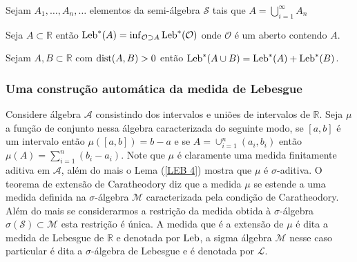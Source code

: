 
\begin{proposicao}
Sejam $A_1, \ldots, A_n, \ldots$ elementos da semi-álgebra 
$\mathcal{S}$ tais que $A=\bigcup_{i=1}^{\infty}A_n$


\end{proposicao}




\begin{proposicao}
Seja $A\subset \mathbb{R}$ então 
$ 
\textnormal{Leb}^{*}(A)
=
\inf_{\mathcal{O}\supset A}\textnormal{Leb}^{*}(\mathcal{O})
$ 
onde $\mathcal{O}$ é um aberto contendo $A$.
\end{proposicao}


\begin{proposicao}
Sejam $A,B\subset \mathbb{R}$ com $\textnormal{dist}(A,B)>0$ 
então 
$
\textnormal{Leb}^{*}(A\cup B)
=
\textnormal{Leb}^{*}(A)+\textnormal{Leb}^{*}(B)
$.
\end{proposicao}



\subsubsection{Uma construç\~ao autom\'atica da medida de Lebesgue}


Considere álgebra $\mathcal{A}$ consistindo dos 
intervalos e uniões de intervalos de   $\mathbb{R}.$ 
Seja  $\mu$ a  função de conjunto  nessa álgebra 
caracterizada do seguinte modo, se $[a,b]$ é um 
intervalo  então $\mu([a,b])=b-a$ 
e se $A=\cup_{i=1}^n(a_i,b_i)$ então 
$\mu(A)=\sum_{i=1}^n(b_i-a_i).$  
Note que $\mu$ é claramente uma medida 
finitamente aditiva em $\mathcal{A}$, 
além do mais o Lema (\ref{LEB 4}) mostra 
que $\mu$ é $\sigma$-aditiva. 
O teorema de extensão de Caratheodory diz que a 
medida $\mu$ se estende a uma medida definida na 
$\sigma$-álgebra  $\mathcal{M}$  
caracterizada pela condição de Caratheodory. 
Além do mais se considerarmos a restrição 
da medida obtida  à $\sigma$-álgebra
$\sigma(\mathcal{S})\subset \mathcal{M}$ 
esta restrição é única. A medida que é a 
extensão de $\mu$ é dita a medida de Lebesgue 
de $\mathbb{R}$ e denotada por $\textnormal{Leb}$, 
a sigma álgebra $\mathcal{M}$ nesse caso particular
é dita a $\sigma$-álgebra de Lebesgue e é denotada por $\mathcal{L}$.






































